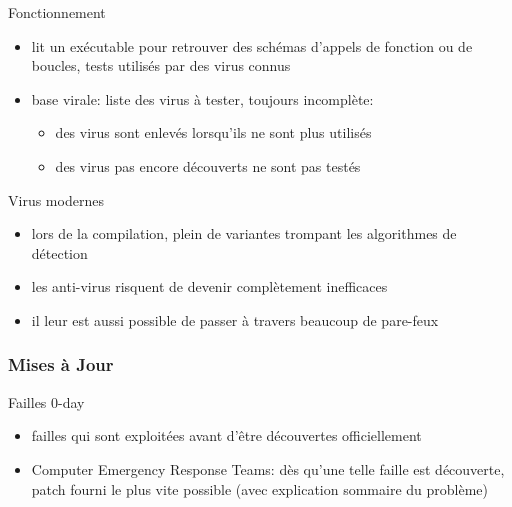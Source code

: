 \begin{reveals}
\begin{frame}
   \begin{block}{Fonctionnement}
     \begin{itemize}
     \item lit un exécutable pour retrouver des schémas d'appels de
       fonction ou de boucles, tests utilisés par des virus connus
     \item base virale: liste des virus à tester, toujours incomplète:
       \begin{itemize}
       \item des virus sont enlevés lorsqu'ils ne sont plus utilisés
       \item des virus pas encore découverts ne sont pas testés
       \end{itemize}
     \end{itemize}
  \end{block}

  \vfill

  \begin{block}{Virus modernes}
    \begin{itemize}
    \item lors de la compilation, plein de variantes trompant les
      algorithmes de détection
    \item les anti-virus risquent de devenir complètement inefficaces
    \item il leur est aussi possible de passer à travers beaucoup de pare-feux
    \end{itemize}
  \end{block}

  \vfill



\end{frame}



\begin{frame}
  \frametitle{Mises à Jour}

  \vfill

   \begin{block}{Failles 0-day}
     \begin{itemize}
     \item failles qui sont exploitées avant d'être découvertes officiellement
     \item Computer Emergency Response Teams: dès qu'une telle faille
       est découverte, patch fourni le plus vite possible (avec
       explication sommaire du problème)
     \end{itemize}
  \end{block}


\end{frame}
\end{reveals}
